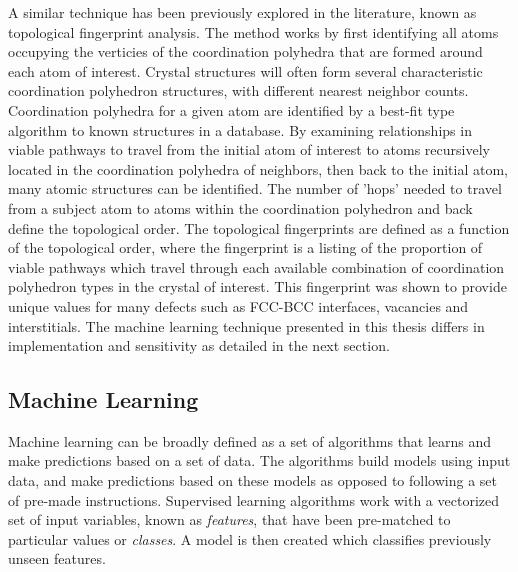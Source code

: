 \documentclass[12pt]{iopart}
\begin{document}
A similar technique has been previously explored in the literature, known as topological fingerprint analysis. \cite{Schablitzki2013} The method works by first identifying all atoms occupying the verticies of the coordination polyhedra that are formed around each atom of interest. Crystal structures will often form several characteristic coordination polyhedron structures, with different nearest neighbor counts. Coordination polyhedra for a given atom are identified by a best-fit type algorithm to known structures in a database. By examining relationships in viable pathways to travel from the initial atom of interest to atoms recursively located in the coordination polyhedra of neighbors, then back to the initial atom, many atomic structures can be identified. The number of 'hops' needed to travel from a subject atom to atoms within the coordination polyhedron and back define the topological order. The topological fingerprints are defined as a function of the topological order, where the fingerprint is a listing of the proportion of viable pathways which travel through each available combination of coordination polyhedron types in the crystal of interest. This fingerprint was shown to provide unique values for many defects such as FCC-BCC interfaces, vacancies and interstitials. The machine learning technique presented in this thesis differs in implementation and sensitivity as detailed in the next section.

\subsection{Machine Learning}

Machine learning can be broadly defined as a set of algorithms that learns and make predictions based on a set of data. The algorithms build models using input data, and make predictions based on these models as opposed to following a set of pre-made instructions.\cite{Mohri2012} Supervised learning algorithms work with a vectorized set of input variables, known as \textit{features}, that have been pre-matched to particular values or \textit{classes}. A model is then created which classifies previously unseen features.
\end{document}
